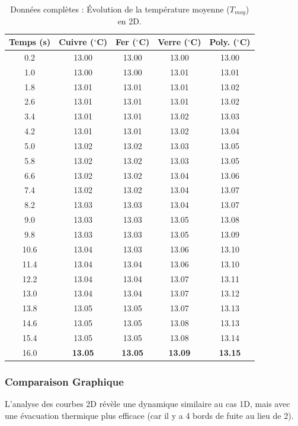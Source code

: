 \documentclass[a4paper,12pt]{article}
\begin{document}
\begin{table}[H]
    \centering
    \scriptsize
    \begin{tabular}{|c||c|c|c|c|}
        \hline
        \textbf{Temps (s)} & \textbf{Cuivre ($^\circ$C)} & \textbf{Fer ($^\circ$C)} & \textbf{Verre ($^\circ$C)} & \textbf{Poly. ($^\circ$C)} \\
        \hline \hline
        0.2  & 13.00 & 13.00 & 13.00 & 13.00 \\
        1.0  & 13.00 & 13.00 & 13.01 & 13.01 \\
        1.8  & 13.01 & 13.01 & 13.01 & 13.02 \\
        2.6  & 13.01 & 13.01 & 13.01 & 13.02 \\
        3.4  & 13.01 & 13.01 & 13.02 & 13.03 \\
        4.2  & 13.01 & 13.01 & 13.02 & 13.04 \\
        5.0  & 13.02 & 13.02 & 13.03 & 13.05 \\
        5.8  & 13.02 & 13.02 & 13.03 & 13.05 \\
        6.6  & 13.02 & 13.02 & 13.04 & 13.06 \\
        7.4  & 13.02 & 13.02 & 13.04 & 13.07 \\
        8.2  & 13.03 & 13.03 & 13.04 & 13.07 \\
        9.0  & 13.03 & 13.03 & 13.05 & 13.08 \\
        9.8  & 13.03 & 13.03 & 13.05 & 13.09 \\
        10.6 & 13.04 & 13.03 & 13.06 & 13.10 \\
        11.4 & 13.04 & 13.04 & 13.06 & 13.10 \\
        12.2 & 13.04 & 13.04 & 13.07 & 13.11 \\
        13.0 & 13.04 & 13.04 & 13.07 & 13.12 \\
        13.8 & 13.05 & 13.05 & 13.07 & 13.13 \\
        14.6 & 13.05 & 13.05 & 13.08 & 13.13 \\
        15.4 & 13.05 & 13.05 & 13.08 & 13.14 \\
        16.0 & \textbf{13.05} & \textbf{13.05} & \textbf{13.09} & \textbf{13.15} \\
        \hline
    \end{tabular}
    \caption{Données complètes : Évolution de la température moyenne ($T_{moy}$) en 2D.}
    \label{tab:tmoy_2d_full}
\end{table}

\subsubsection{Comparaison Graphique}
L'analyse des courbes 2D révèle une dynamique similaire au cas 1D, mais avec une évacuation thermique plus efficace (car il y a 4 bords de fuite au lieu de 2).
\end{document}
